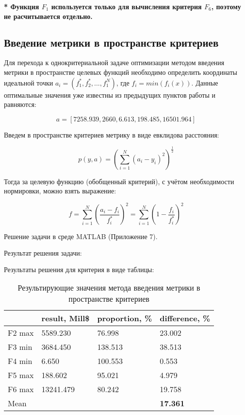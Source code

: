\textbf{* Функция $F_1$ используется только для вычисления критерия $F_6$, поэтому не расчитывается отдельно.}

\subsection{Введение метрики в пространстве критериев}

Для перехода к однокритериальной задаче оптимизации методом введения метрики в пространстве целевых функций необходимо определить координаты идеальной точки $a_i=(f_1^*,f_2^*,...,f_1^N)$, где $f_i=min(f_i(x))$. Данные оптимальные значения уже известны из предыдущих пунктов работы и равняются:

\begin{equation*}
\text{$a=[7258.939, 2660, 6.613, 198.485, 16501.964]$}
\end{equation*}

Введем в пространстве критериев метрику в виде евклидова расстояния:

\begin{equation*}
\text{$p(y,a)=(\sum_{i=1}^{N}(a_i-y_i)^2)^{\frac{1}{2}}$}
\end{equation*}

Тогда за целевую функцию (обобщенный критерий), с учётом необходимости нормировки, можно взять выражение:

\begin{equation*}
\text{$f=\sum_{i=1}^{N}(\frac{a_i-f_i}{f_i^*})^2=\sum_{i=1}^{N}(1-\frac{f_i}{f_i^*})^2$}
\end{equation*}

Решение задачи в среде MATLAB (Приложение 7).

Результат решения задачи:



Результаты решения для критерия в виде таблицы:

\begin{table}[h!]
	\centering
	\bgroup
	\captionsetup{singlelinecheck = false, format= hang, justification=raggedleft, font=footnotesize, labelsep=space}
	\caption{Результирующие значения метода введения метрики в пространстве критериев}
	\def\arraystretch{1}
	\begin{tabular}{ | m{1.5cm} | m{1.9cm} | m{2.2cm} | m{2.2cm} | }
		\hline
		& result, Mill\$ & proportion, \% & difference, \% \\ \hline
		F2 max & 5589.230 & 76.998 & 23.002 \\ \hline
		F3 min & 3684.450 & 138.513 & 38.513 \\ \hline
		F4 min & 6.650 & 100.553 & 0.553 \\ \hline
		F5 max & 188.602 & 95.021 & 4.979 \\ \hline
		F6 max & 13241.479 & 80.242 & 19.758 \\ \hline
		Mean & & & \textbf{17.361} \\
		\hline
	\end{tabular}
	\egroup
\end{table}

